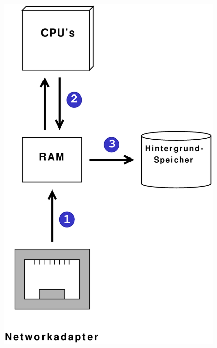 \documentclass{beamer}
\begin{document}
\begin{frame}
\begin{columns}
\includegraphics [width=0.82\textwidth, keepaspectratio]{pics/HardwareView}
\end{columns}
\end{frame}
\end{document}
